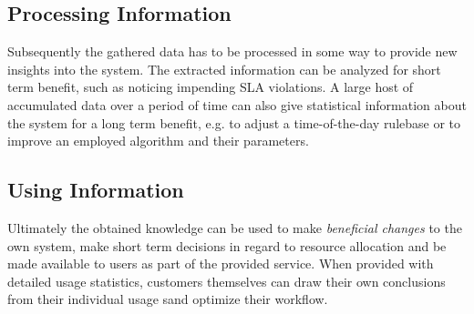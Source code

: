\documentclass[a4paper]{llncs}
\begin{document}
\subsection{Processing Information}
Subsequently the gathered data has to be processed in some way to provide new insights into the system. The extracted information can be analyzed for short term benefit, such as noticing impending SLA violations. A large host of accumulated data over a period of time can also give statistical information about the system for a long term benefit, e.g. to adjust a time-of-the-day rulebase or to improve an employed algorithm and their parameters.\\

\subsection{Using Information}
Ultimately the obtained knowledge can be used to make \textit{beneficial changes} to the own system, make short term decisions in regard to resource allocation and be made available to users as part of the provided service. When provided with detailed usage statistics, customers themselves can draw their own conclusions from their individual usage sand optimize their workflow.
\end{document}
